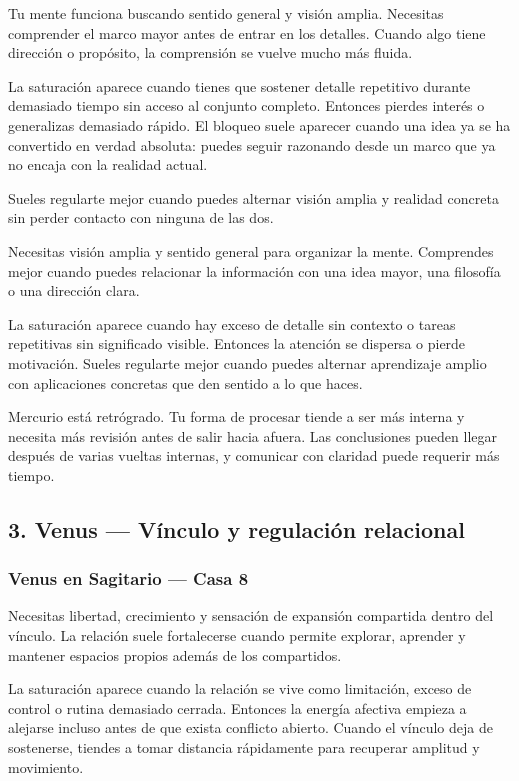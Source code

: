 \documentclass[11pt,a4paper]{article}
\begin{document}
\justifying
Tu mente funciona buscando sentido general y visión amplia. Necesitas comprender el marco mayor antes de entrar en los detalles. Cuando algo tiene dirección o propósito, la comprensión se vuelve mucho más fluida.

La saturación aparece cuando tienes que sostener detalle repetitivo durante demasiado tiempo sin acceso al conjunto completo. Entonces pierdes interés o generalizas demasiado rápido. El bloqueo suele aparecer cuando una idea ya se ha convertido en verdad absoluta: puedes seguir razonando desde un marco que ya no encaja con la realidad actual.

Sueles regularte mejor cuando puedes alternar visión amplia y realidad concreta sin perder contacto con ninguna de las dos.

Necesitas visión amplia y sentido general para organizar la mente. Comprendes mejor cuando puedes relacionar la información con una idea mayor, una filosofía o una dirección clara.

La saturación aparece cuando hay exceso de detalle sin contexto o tareas repetitivas sin significado visible. Entonces la atención se dispersa o pierde motivación. Sueles regularte mejor cuando puedes alternar aprendizaje amplio con aplicaciones concretas que den sentido a lo que haces.

Mercurio está retrógrado. Tu forma de procesar tiende a ser más interna y necesita más revisión antes de salir hacia afuera. Las conclusiones pueden llegar después de varias vueltas internas, y comunicar con claridad puede requerir más tiempo.

\vspace{0.8cm}

\subsection{3. Venus — Vínculo y regulación relacional}

\subsubsection*{Venus en Sagitario — Casa 8}

\justifying
Necesitas libertad, crecimiento y sensación de expansión compartida dentro del vínculo. La relación suele fortalecerse cuando permite explorar, aprender y mantener espacios propios además de los compartidos.

La saturación aparece cuando la relación se vive como limitación, exceso de control o rutina demasiado cerrada. Entonces la energía afectiva empieza a alejarse incluso antes de que exista conflicto abierto. Cuando el vínculo deja de sostenerse, tiendes a tomar distancia rápidamente para recuperar amplitud y movimiento.
\end{document}

